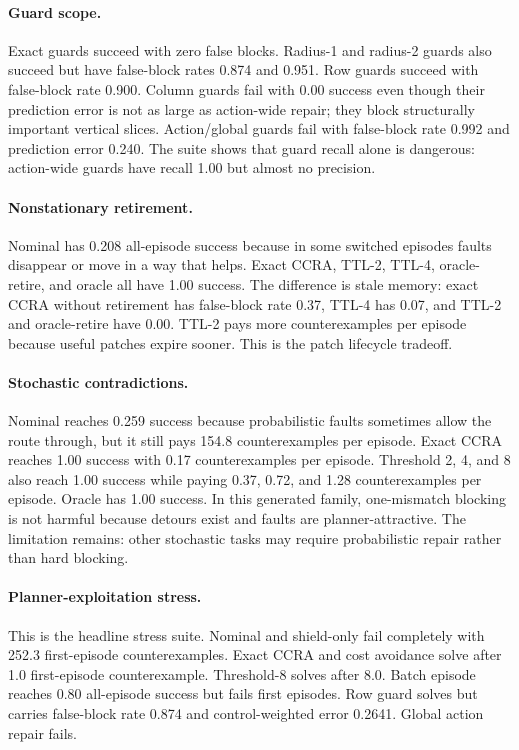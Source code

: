 \documentclass{article}
\begin{document}
\paragraph{Guard scope.}
Exact guards succeed with zero false blocks. Radius-1 and radius-2 guards also succeed but have false-block rates 0.874 and 0.951. Row guards succeed with false-block rate 0.900. Column guards fail with 0.00 success even though their prediction error is not as large as action-wide repair; they block structurally important vertical slices. Action/global guards fail with false-block rate 0.992 and prediction error 0.240. The suite shows that guard recall alone is dangerous: action-wide guards have recall 1.00 but almost no precision.

\paragraph{Nonstationary retirement.}
Nominal has 0.208 all-episode success because in some switched episodes faults disappear or move in a way that helps. Exact CCRA, TTL-2, TTL-4, oracle-retire, and oracle all have 1.00 success. The difference is stale memory: exact CCRA without retirement has false-block rate 0.37, TTL-4 has 0.07, and TTL-2 and oracle-retire have 0.00. TTL-2 pays more counterexamples per episode because useful patches expire sooner. This is the patch lifecycle tradeoff.

\paragraph{Stochastic contradictions.}
Nominal reaches 0.259 success because probabilistic faults sometimes allow the route through, but it still pays 154.8 counterexamples per episode. Exact CCRA reaches 1.00 success with 0.17 counterexamples per episode. Threshold 2, 4, and 8 also reach 1.00 success while paying 0.37, 0.72, and 1.28 counterexamples per episode. Oracle has 1.00 success. In this generated family, one-mismatch blocking is not harmful because detours exist and faults are planner-attractive. The limitation remains: other stochastic tasks may require probabilistic repair rather than hard blocking.

\paragraph{Planner-exploitation stress.}
This is the headline stress suite. Nominal and shield-only fail completely with 252.3 first-episode counterexamples. Exact CCRA and cost avoidance solve after 1.0 first-episode counterexample. Threshold-8 solves after 8.0. Batch episode reaches 0.80 all-episode success but fails first episodes. Row guard solves but carries false-block rate 0.874 and control-weighted error 0.2641. Global action repair fails.
\end{document}

